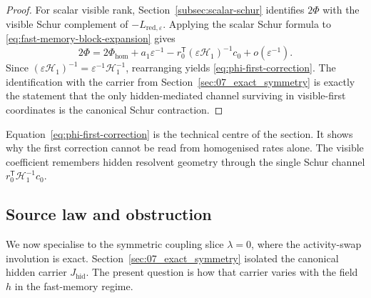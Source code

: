 \documentclass[11pt]{article}
\numberwithin{equation}{section}
\newcommand{\eps}{\varepsilon}
\theoremstyle{thmcompact}
\theoremstyle{remark}
\begin{document}
\begin{proof}
For scalar visible rank, Section~\ref{subsec:scalar-schur} identifies $2\Phi$ with the visible Schur complement of $-L_{\mathrm{red},\eps}$. Applying the scalar Schur formula to \eqref{eq:fast-memory-block-expansion} gives
\[
2\Phi
=
2\Phi_{\mathrm{hom}}+a_1\eps^{-1}-r_0^{\mathsf T}(\eps\mathcal H_1)^{-1}c_0+o(\eps^{-1}).
\]
Since $(\eps\mathcal H_1)^{-1}=\eps^{-1}\mathcal H_1^{-1}$, rearranging yields \eqref{eq:phi-first-correction}. The identification with the carrier from Section~\ref{sec:07_exact_symmetry} is exactly the statement that the only hidden-mediated channel surviving in visible-first coordinates is the canonical Schur contraction.
\end{proof}

Equation~\eqref{eq:phi-first-correction} is the technical centre of the section. It shows why the first correction cannot be read from homogenised rates alone. The visible coefficient remembers hidden resolvent geometry through the single Schur channel $r_0^{\mathsf T}\mathcal H_1^{-1}c_0$.

\subsection{Source law and obstruction}

We now specialise to the symmetric coupling slice $\lambda=0$, where the activity-swap involution is exact. Section~\ref{sec:07_exact_symmetry} isolated the canonical hidden carrier $J_{\mathrm{hid}}$. The present question is how that carrier varies with the field $h$ in the fast-memory regime.
\end{document}
